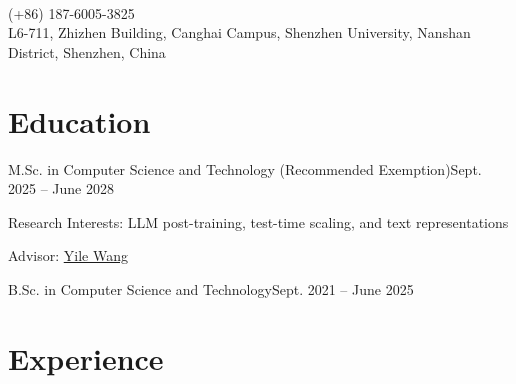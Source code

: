 \begin{center}
  {\fontsize{25}{28}\selectfont\bfseries{}}\\[2.6mm]
  {\small
    \cvicon{\faPhone*}(+86) 187-6005-3825\cvsep
    \cvsep
    \cvsep
    \cvsep
    }\\[1.2mm]
  {\small\color{muted}
    \cvicon{\faMapMarker*}L6-711, Zhizhen Building, Canghai Campus, Shenzhen University, Nanshan District, Shenzhen, China}
\end{center}
\vspace{-1.5mm}


\section{Education}

  {M.Sc. in Computer Science and Technology (Recommended Exemption)}{Sept. 2025 -- June 2028}
\begin{cvitems}
  \item Research Interests: LLM post-training, test-time scaling, and text representations
  \item Advisor: \href{https://ylwangy.github.io/}{Yile Wang}
\end{cvitems}

  {B.Sc. in Computer Science and Technology}{Sept. 2021 -- June 2025}

\section{Experience}

